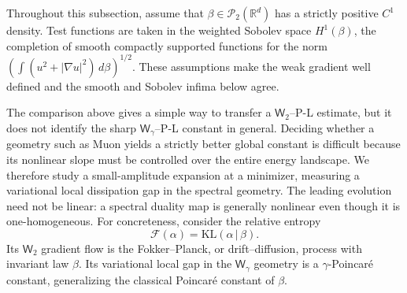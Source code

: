 \documentclass{article}
\newcommand{\R}{\mathbb{R}}
\newcommand{\cP}{\mathcal{P}}
\newcommand{\MF}{\mathcal{F}}
\newcommand{\Wtwo}{\mathsf{W}_2}
\newcommand{\Wg}{\mathsf{W}_{\gamma}}
\newcommand{\KL}{\mathrm{KL}}
\begin{document}
Throughout this subsection, assume that $\beta\in\cP_2(\R^d)$ has a strictly
positive $C^1$ density. Test functions are taken in the weighted Sobolev space
$H^1(\beta)$, the completion of smooth compactly supported functions for the
norm $\left(\int (u^2+|\nabla u|^2)\,d\beta\right)^{1/2}$.
These assumptions make the weak gradient
well defined and the smooth and Sobolev infima below agree.

The comparison above gives a simple way to transfer a $\Wtwo$--P-L estimate,
but it does not identify the sharp $\Wg$--P-L constant in general.  Deciding
whether a geometry such as Muon yields a strictly better global constant is
difficult because its nonlinear slope must be controlled over the entire
energy landscape. We therefore study a small-amplitude expansion at a
minimizer, measuring a variational local dissipation gap in the spectral
geometry. The leading evolution need not be linear: a spectral duality map
is generally nonlinear even though it is one-homogeneous.
For concreteness, consider the relative entropy
\[
    \MF(\alpha)=\KL(\alpha\,|\,\beta).
\]
Its $\Wtwo$ gradient flow is the Fokker--Planck, or drift--diffusion, process
with invariant law $\beta$. Its variational local gap in the $\Wg$ geometry is a
$\gamma$-Poincar\'e constant, generalizing the classical Poincar\'e constant of
$\beta$.
\end{document}
